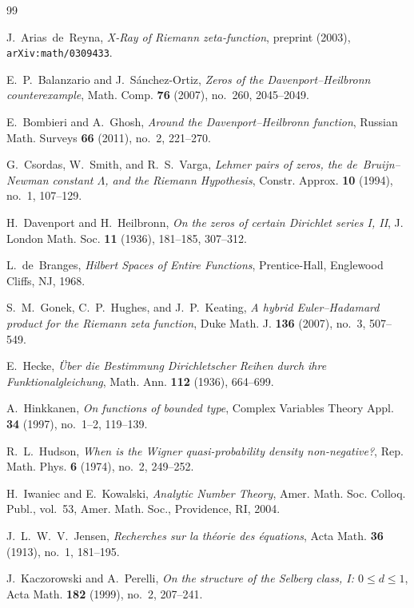 \documentclass[11pt,reqno]{amsart}
\theoremstyle{definition}
\theoremstyle{remark}
\numberwithin{equation}{section}
\begin{document}
\begin{thebibliography}{99}

J.~Arias~de~Reyna, \emph{X-Ray of Riemann zeta-function}, preprint (2003), \texttt{arXiv:math/0309433}.

E.~P.~Balanzario and J.~S\'anchez-Ortiz, \emph{Zeros of the Davenport--Heilbronn counterexample}, Math. Comp. \textbf{76} (2007), no.~260, 2045--2049.

E.~Bombieri and A.~Ghosh, \emph{Around the Davenport--Heilbronn function}, Russian Math. Surveys \textbf{66} (2011), no.~2, 221--270.

G.~Csordas, W.~Smith, and R.~S.~Varga, \emph{Lehmer pairs of zeros, the de~Bruijn--Newman constant $\Lambda$, and the Riemann Hypothesis}, Constr. Approx. \textbf{10} (1994), no.~1, 107--129.

H.~Davenport and H.~Heilbronn, \emph{On the zeros of certain Dirichlet series I, II}, J. London Math. Soc. \textbf{11} (1936), 181--185, 307--312.

L.~de~Branges, \emph{Hilbert Spaces of Entire Functions}, Prentice-Hall, Englewood Cliffs, NJ, 1968.

S.~M.~Gonek, C.~P.~Hughes, and J.~P.~Keating, \emph{A hybrid Euler--Hadamard product for the Riemann zeta function}, Duke Math. J. \textbf{136} (2007), no.~3, 507--549.

E.~Hecke, \emph{\"Uber die Bestimmung Dirichletscher Reihen durch ihre Funktionalgleichung}, Math. Ann. \textbf{112} (1936), 664--699.

A.~Hinkkanen, \emph{On functions of bounded type}, Complex Variables Theory Appl. \textbf{34} (1997), no.~1--2, 119--139.

R.~L.~Hudson, \emph{When is the Wigner quasi-probability density non-negative?}, Rep. Math. Phys. \textbf{6} (1974), no.~2, 249--252.

H.~Iwaniec and E.~Kowalski, \emph{Analytic Number Theory}, Amer. Math. Soc. Colloq. Publ., vol.~53, Amer. Math. Soc., Providence, RI, 2004.

J.~L.~W.~V.~Jensen, \emph{Recherches sur la th\'eorie des \'equations}, Acta Math. \textbf{36} (1913), no.~1, 181--195.

J.~Kaczorowski and A.~Perelli, \emph{On the structure of the Selberg class, I: $0 \le d \le 1$}, Acta Math. \textbf{182} (1999), no.~2, 207--241.


\end{thebibliography}
\end{document}
